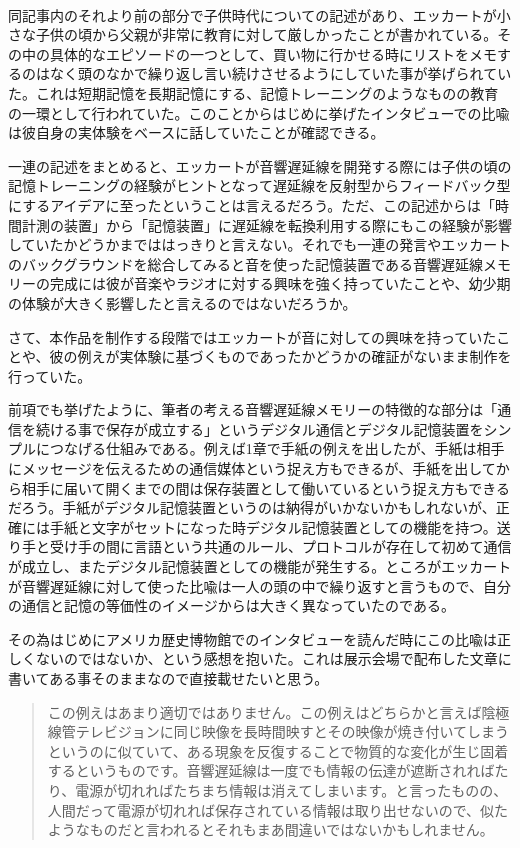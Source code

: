 \documentclass[a4paper,report]{jsbook}
\begin{document}
\autocite[筆者訳]{eckstein1996j}\\
同記事内のそれより前の部分で子供時代についての記述があり、エッカートが小さな子供の頃から父親が非常に教育に対して厳しかったことが書かれている。その中の具体的なエピソードの一つとして、買い物に行かせる時にリストをメモするのはなく頭のなかで繰り返し言い続けさせるようにしていた事が挙げられていた。これは短期記憶を長期記憶にする、記憶トレーニングのようなものの教育の一環として行われていた。このことからはじめに挙げたインタビューでの比喩は彼自身の実体験をベースに話していたことが確認できる。

一連の記述をまとめると、エッカートが音響遅延線を開発する際には子供の頃の記憶トレーニングの経験がヒントとなって遅延線を反射型からフィードバック型にするアイデアに至ったということは言えるだろう。ただ、この記述からは「時間計測の装置」から「記憶装置」に遅延線を転換利用する際にもこの経験が影響していたかどうかまでははっきりと言えない。それでも一連の発言やエッカートのバックグラウンドを総合してみると音を使った記憶装置である音響遅延線メモリーの完成には彼が音楽やラジオに対する興味を強く持っていたことや、幼少期の体験が大きく影響したと言えるのではないだろうか。

さて、本作品を制作する段階ではエッカートが音に対しての興味を持っていたことや、彼の例えが実体験に基づくものであったかどうかの確証がないまま制作を行っていた。

前項でも挙げたように、筆者の考える音響遅延線メモリーの特徴的な部分は「通信を続ける事で保存が成立する」というデジタル通信とデジタル記憶装置をシンプルにつなげる仕組みである。例えば1章で手紙の例えを出したが、手紙は相手にメッセージを伝えるための通信媒体という捉え方もできるが、手紙を出してから相手に届いて開くまでの間は保存装置として働いているという捉え方もできるだろう。手紙がデジタル記憶装置というのは納得がいかないかもしれないが、正確には手紙と文字がセットになった時デジタル記憶装置としての機能を持つ。送り手と受け手の間に言語という共通のルール、プロトコルが存在して初めて通信が成立し、またデジタル記憶装置としての機能が発生する。ところがエッカートが音響遅延線に対して使った比喩は一人の頭の中で繰り返すと言うもので、自分の通信と記憶の等価性のイメージからは大きく異なっていたのである。

その為はじめにアメリカ歴史博物館でのインタビューを読んだ時にこの比喩は正しくないのではないか、という感想を抱いた。これは展示会場で配布した文章に書いてある事そのままなので直接載せたいと思う。

\begin{quote}
この例えはあまり適切ではありません。この例えはどちらかと言えば陰極線管テレビジョンに同じ映像を長時間映すとその映像が焼き付いてしまうというのに似ていて、ある現象を反復することで物質的な変化が生じ固着するというものです。音響遅延線は一度でも情報の伝達が遮断されればたり、電源が切れればたちまち情報は消えてしまいます。と言ったものの、人間だって電源が切れれば保存されている情報は取り出せないので、似たようなものだと言われるとそれもまあ間違いではないかもしれません。
\end{quote}
\end{document}
